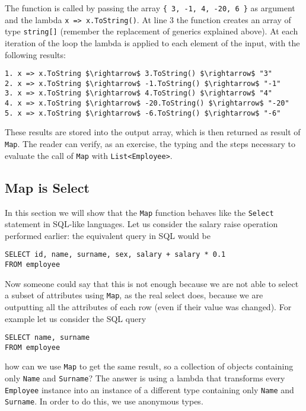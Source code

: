 The function is called by passing the array \texttt{\{ 3, -1, 4, -20, 6 \}} as argument and the lambda \texttt{x => x.ToString()}. At line 3 the function creates an array of type \texttt{string[]} (remember the replacement of generics explained above). At each iteration of the loop the lambda is applied to each element of the input, with the following results:

\begin{lstlisting}[mathescape = true]
1. x => x.ToString $\rightarrow$ 3.ToString() $\rightarrow$ "3"
2. x => x.ToString $\rightarrow$ -1.ToString() $\rightarrow$ "-1"
3. x => x.ToString $\rightarrow$ 4.ToString() $\rightarrow$ "4"
4. x => x.ToString $\rightarrow$ -20.ToString() $\rightarrow$ "-20"
5. x => x.ToString $\rightarrow$ -6.ToString() $\rightarrow$ "-6"
\end{lstlisting}

\noindent
These results are stored into the output array, which is then returned as result of \texttt{Map}. The reader can verify, as an exercise, the typing and the steps necessary to evaluate the call of \texttt{Map} with \texttt{List<Employee>}.

\subsection{Map is Select}
\label{subsec:select}
In this section we will show that the \texttt{Map} function behaves like the \texttt{Select} statement in SQL-like languages. Let us consider the salary raise operation performed earlier: the equivalent query in SQL would be

\begin{lstlisting}
SELECT id, name, surname, sex, salary + salary * 0.1
FROM employee
\end{lstlisting}

\noindent
Now someone could say that this is not enough because we are not able to select a subset of attributes using \texttt{Map}, as the real select does, because we are outputting all the attributes of each row (even if their value was changed). For example let us consider the SQL query

\begin{lstlisting}
SELECT name, surname
FROM employee
\end{lstlisting}

\noindent
how can we use \texttt{Map} to get the same result, so a collection of objects containing only \texttt{Name} and \texttt{Surname}? The answer is using a lambda that transforms every \texttt{Employee} instance into an instance of a different type containing only \texttt{Name} and \texttt{Surname}. In order to do this, we use anonymous types.

